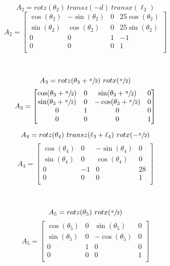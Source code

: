 \documentclass[12pt]{report}
\begin{document}
\begin{minipage}[b]{.5\textwidth}
\strut\vspace*{-\baselineskip}\newline
\[
A_2 = rotz(\theta_2) ~ transz(-d) ~ transx(\ell_2)
\]
\vspace{.25ex}
\[
A_2 =
\begin{bmatrix}
  \cos(\theta_2) & -\sin(\theta_2) & 0 & 25\cos(\theta_2) \\
  \sin(\theta_2) & \cos(\theta_2) & 0 & 25\sin(\theta_2) \\
  0 & 0 & 1 & -1 \\
  0 & 0 & 0 & 1 \\
\end{bmatrix}
\]
\end{minipage}\\
\begin{minipage}[c]{.5\textwidth}
\[
A_3 = rotz(\theta_3 + \sfrac{\pi}{2}) ~ rotx(\sfrac{\pi}{2})
\]
\vspace{.25ex}
\[
A_3 =
\begin{bmatrix}
  \cos(\theta_3 +  \sfrac{\pi}{2}) & 0 & \sin(\theta_3 +  \sfrac{\pi}{2}) & 0 \\
  \sin(\theta_3 +  \sfrac{\pi}{2}) & 0 & -\cos(\theta_3 +  \sfrac{\pi}{2}) & 0 \\
  0 & 1 & 0 & 0 \\
  0 & 0 & 0 & 1 \\
\end{bmatrix}
\]
\end{minipage}%
\begin{minipage}[c]{.5\textwidth}
\[
A_4 = rotz(\theta_4) ~ transz(\ell_3 + \ell_4) ~ rotx(-\sfrac{\pi}{2})
\]
\[
A_4 =
\begin{bmatrix}
  \cos(\theta_4) & 0 & -\sin(\theta_4) & 0 \\
  \sin(\theta_4) & 0 & \cos(\theta_4) & 0 \\
  0 & -1 & 0 & 28 \\
  0 & 0 & 0 & 1 \\
\end{bmatrix}
\]
\vspace{.25ex}
\end{minipage}\\
\begin{minipage}[c]{.5\textwidth}
\[
A_5 = rotz(\theta_5) ~ rotx(\sfrac{\pi}{2})
\]
\vspace{.25ex}
\[
A_5 =
\begin{bmatrix}
  \cos(\theta_5) & 0 & \sin(\theta_5) & 0 \\
  \sin(\theta_5) & 0 & -\cos(\theta_5) & 0 \\
  0 & 1 & 0 & 0 \\
  0 & 0 & 0 & 1 \\
\end{bmatrix}
\]
\end{minipage}%
\end{document}
